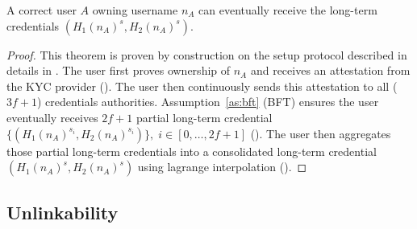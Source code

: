 \begin{theorem} \label{th:key-discovery-termination}
    A correct user $A$ owning username $n_A$ can eventually receive the long-term credentials $(H_1(n_A)^s, H_2(n_A)^s)$.
\end{theorem}
\begin{proof}
    This theorem is proven by construction on the setup protocol described in details in .
    The user first proves ownership of $n_A$ and receives an attestation from the KYC provider ().
    The user then continuously sends this attestation to all ($3f+1$) credentials authorities. Assumption~\ref{as:bft} (BFT) ensures the user eventually receives $2f+1$ partial long-term credential $\{(H_1(n_A)^{s_i}, H_2(n_A)^{s_i})\}, \; i \in [0,\dots,2f+1]$ ().
    The user then aggregates those partial long-term credentials into a consolidated long-term credential $(H_1(n_A)^{s}, H_2(n_A)^{s})$ using lagrange interpolation ().
\end{proof}


\subsection{Unlinkability} \label{sec:unlinkability}
